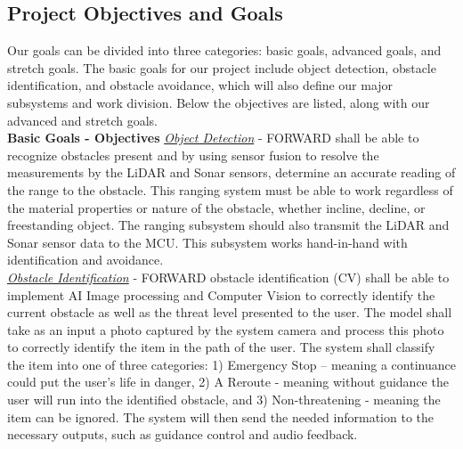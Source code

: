 \subsection{Project Objectives and Goals}
\noindent Our goals can be divided into three categories: basic goals, advanced goals, and stretch goals. The basic goals for our project include object detection, obstacle identification, and obstacle avoidance, which will also define our major subsystems and work division. Below the objectives are listed, along with our advanced and stretch goals. \\

\noindent \textbf{Basic Goals - Objectives} \newline
\noindent \underline{\textit{Object Detection}} - FORWARD shall be able to recognize obstacles present and by using sensor fusion to resolve the measurements by the LiDAR and Sonar sensors, determine an accurate reading of the range to the obstacle. This ranging system must be able to work regardless of the material properties or nature of the obstacle, whether incline, decline, or freestanding object. The ranging subsystem should also transmit the LiDAR and Sonar sensor data to the MCU. This subsystem works hand-in-hand with identification and avoidance.\\

\noindent \underline{\textit{Obstacle Identification}} - FORWARD obstacle identification (CV) shall be able to implement AI Image processing and Computer Vision to correctly identify the current obstacle as well as the threat level presented to the user. The model shall take as an input a photo captured by the system camera and process this photo to correctly identify the item in the path of the user. The system shall classify the item into one of three categories: 1) Emergency Stop – meaning a continuance could put the user’s life in danger, 2) A Reroute - meaning without guidance the user will run into the identified obstacle, and 3) Non-threatening - meaning the item can be ignored. The system will then send the needed information to the necessary outputs, such as guidance control and audio feedback. \\

